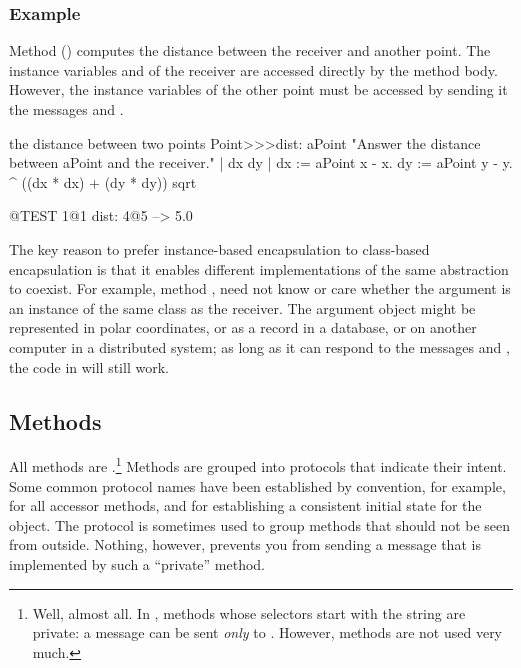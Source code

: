 \documentclass[a4paper,10pt,twoside]{book}
\begin{document}
\subsubsection{Example}
Method  () computes the distance between the receiver and another point. The instance variables  and  of the receiver are accessed directly by the method body.  However, the instance variables of the other point must be accessed by sending it the messages  and .

\begin{method}[dist:]{the distance between two points}
Point>>>dist: aPoint 
	"Answer the distance between aPoint and the receiver."  
	| dx dy |
	dx := aPoint x - x.
	dy :=  aPoint y - y.
	^ ((dx * dx) + (dy * dy)) sqrt
\end{method}

\begin{code}{@TEST}
1@1 dist: 4@5 --> 5.0
\end{code}

The key reason to prefer instance-based encapsulation to class-based encapsulation is that it enables different implementations of the same abstraction to coexist.
For example, method , need not know or care whether the argument  is an instance of the same class as the receiver.  The argument object might be represented in polar coordinates, or as a record in a database, or on another computer in a distributed system; as long as it can respond to the messages  and , the code in  will still work.

\subsection{Methods}

All methods are .\footnote{Well, almost all.  In \pharo, methods whose selectors start with the string  are private: a  message can be sent \emph{only} to \self.  However,  methods are not used very much.}
Methods are grouped into protocols that indicate their intent.
Some common protocol names have been established by convention, for example,  for all accessor methods, and  for establishing a consistent initial state for the object.
The protocol  is sometimes used to group methods that should not be seen from outside.
Nothing, however, prevents you from sending a message that is implemented by such a ``private'' method.
\end{document}
